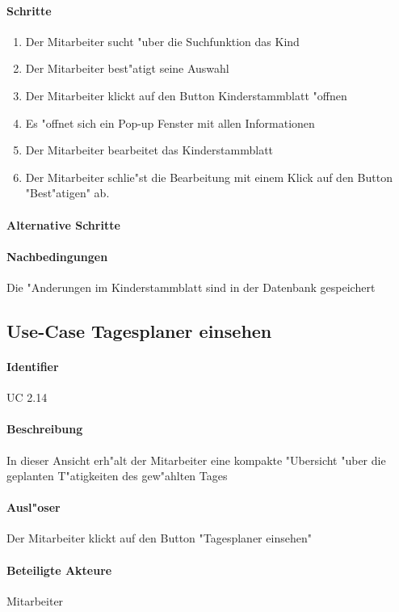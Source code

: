   \paragraph{Schritte}
  \begin{enumerate}
  	\item Der Mitarbeiter sucht "uber die Suchfunktion das Kind
  	\item Der Mitarbeiter best"atigt seine Auswahl
  	\item Der Mitarbeiter klickt auf den Button \dq Kinderstammblatt "offnen\dq
  	\item Es "offnet sich ein Pop-up Fenster mit allen Informationen
  	\item Der Mitarbeiter bearbeitet das Kinderstammblatt
  	\item Der Mitarbeiter schlie"st die Bearbeitung mit einem Klick auf den Button "Best"atigen" ab. 
  \end{enumerate}
  
  \paragraph{Alternative Schritte}
  \paragraph{Nachbedingungen}
  Die "Anderungen im Kinderstammblatt sind in der Datenbank gespeichert
  
  
  \newpage
 \subsection{Use-Case Tagesplaner einsehen}
  \paragraph{Identifier}
  UC 2.14
  \paragraph{Beschreibung}
  In dieser Ansicht erh"alt der Mitarbeiter eine kompakte "Ubersicht "uber die geplanten T"atigkeiten des gew"ahlten Tages
  \paragraph{Ausl"oser}
  Der Mitarbeiter klickt auf den Button "Tagesplaner einsehen"
  \paragraph{Beteiligte Akteure}   \leavevmode \newline
    Mitarbeiter
